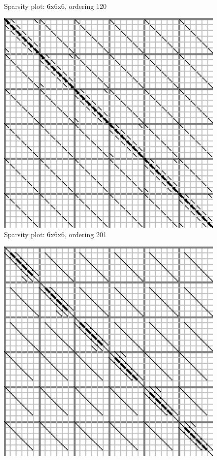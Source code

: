 \documentclass[10pt]{article}
\begin{document}
\begin{multicols}{2}
\begin{center}
\begin{minipage}[t]{.5\textwidth}
\begin{figure}[H]
    \caption{Sparsity plot: 6x6x6, ordering 120 }
\end{figure}
\vspace{\spmgin}
\begin{figure}[H]
    \centering
    \includegraphics[width=\spwidth]{../img/sparsity/int_small_6x6x6_201.eps}
    \caption{Sparsity plot: 6x6x6, ordering 201 }
\end{figure}
\vspace{\spmgin}
\begin{figure}[H]
    \centering
    \includegraphics[width=\spwidth]{../img/sparsity/int_small_6x6x6_210.eps}

\end{figure}
\end{minipage}
\end{center}
\end{multicols}
\end{document}
